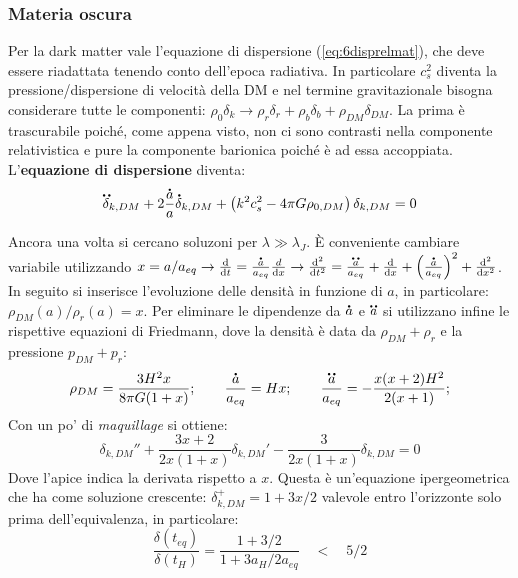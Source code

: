 \subsubsection{Materia oscura}
Per la dark matter vale l'equazione di dispersione (\ref{eq:6disprelmat}), che deve essere riadattata tenendo conto dell'epoca radiativa. In particolare $c_s^2$ diventa la pressione/dispersione di velocità della DM e nel termine gravitazionale bisogna considerare tutte le componenti: $\rho_0 \delta_k \rightarrow \rho_r\delta_r + \rho_{b}\delta_{b} + \rho_{DM}\delta_{DM} $. La prima è trascurabile poiché, come appena visto, non ci sono contrasti nella componente relativistica e pure la componente barionica poiché è ad essa accoppiata. L'\textbf{equazione di dispersione} diventa:
\begin{equation}
    \accentset{\mbox{\large\bfseries ..}}{\delta}_{k,DM}+ 2 \frac{\accentset{\mbox{\large\bfseries .}}{a}}{a}\accentset{\mbox{\large\bfseries .}}{\delta}_{k,DM} + \left( k^2 c_s^2 -4\pi G \rho_{0,DM}\right)\delta_{k,DM}  =0
\end{equation}

Ancora una volta si cercano soluzoni per $\lambda \gg \lambda_J$. È conveniente cambiare variabile utilizzando $x=a/a_{eq}\rightarrow \frac{\d{}}{\d{t}}=\frac{\dt{a}}{a_{eq}}\frac{d{}}{\d{x}}\rightarrow \frac{\d{}^2}{\d{t^2}}=\frac{\ddt{a}}{a_{eq}}+\frac{\d{}}{\d{x}}+\left(\frac{\dt{a}}{a_{eq}}\right)^2 + \frac{\d{}^2}{\d{x^2}}$. In seguito si inserisce l'evoluzione delle densità in funzione di $a$, in particolare: $\rho_{DM} (a) / \rho_r(a) = x$. Per eliminare le dipendenze da $\accentset{\mbox{\large\bfseries .}}{a}$ e $\accentset{\mbox{\large\bfseries ..}}{a}$ si utilizzano infine le rispettive equazioni di Friedmann, dove la densità è data da $\rho_{DM}+\rho_{r}$ e la pressione $p_{DM}+p_r$:
\begin{equation*}
    \rho_{DM}=\frac{3H^2 x}{8\pi G (1+x)}; \qquad \frac{\accentset{\mbox{\large\bfseries .}}{a}}{a_{eq}}=Hx; \qquad \frac{\accentset{\mbox{\large\bfseries ..}}{a}}{a_{eq}}=-\frac{x(x+2)H^2}{2(x+1)};   
\end{equation*}
Con un po' di \textit{maquillage} si ottiene:
\begin{equation}
    \delta_{k,DM}'' + \frac{3x+2}{2x(1+x)}\delta_{k,DM}' - \frac{3}{2x(1+x)}\delta_{k,DM}=0
\end{equation}
Dove l'apice indica la derivata rispetto a $x$. Questa è un'equazione ipergeometrica che ha come soluzione crescente: $\delta_{k,DM}^+ = 1+3x/2$ valevole entro l'orizzonte solo prima dell'equivalenza, in particolare:
\begin{equation}
    \frac{\delta (t_{eq})}{\delta(t_H)}=\frac{1+3/2}{1+3a_H/2a_{eq}} \quad < \quad 5/2
\end{equation}

